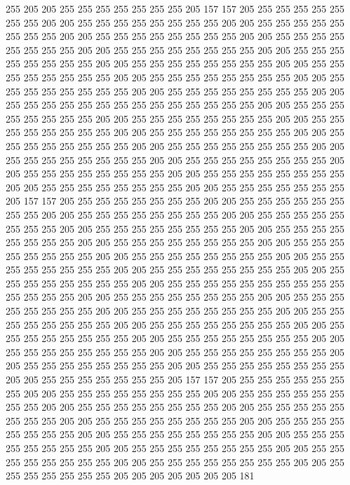 255 205 205 255 255 255 255 255 255 255 205 157 157 205 255 255 255 255 255 255
255 205 205 255 255 255 255 255 255 255 255 205 205 255 255 255 255 255 255 255
255 205 205 255 255 255 255 255 255 255 255 205 205 255 255 255 255 255 255 255
255 205 205 255 255 255 255 255 255 255 255 205 205 255 255 255 255 255 255 255
255 205 205 255 255 255 255 255 255 255 255 205 205 255 255 255 255 255 255 255
255 205 205 255 255 255 255 255 255 255 255 205 205 255 255 255 255 255 255 255
255 205 205 255 255 255 255 255 255 255 255 205 205 255 255 255 255 255 255 255
255 255 255 255 255 255 255 205 205 255 255 255 255 255 255 255 255 205 205 255
255 255 255 255 255 255 255 205 205 255 255 255 255 255 255 255 255 205 205 255
255 255 255 255 255 255 255 205 205 255 255 255 255 255 255 255 255 205 205 255
255 255 255 255 255 255 255 205 205 255 255 255 255 255 255 255 255 205 205 255
255 255 255 255 255 255 255 205 205 255 255 255 255 255 255 255 255 205 205 255
255 255 255 255 255 255 255 205 205 255 255 255 255 255 255 255 255 205 205 255
255 255 255 255 255 255 205 157 157 205 255 255 255 255 255 255 255 205 205 255
255 255 255 255 255 255 255 205 205 255 255 255 255 255 255 255 255 205 205 255
255 255 255 255 255 255 255 205 205 255 255 255 255 255 255 255 255 205 205 255
255 255 255 255 255 255 255 205 205 255 255 255 255 255 255 255 255 205 205 255
255 255 255 255 255 255 255 205 205 255 255 255 255 255 255 255 255 205 205 255
255 255 255 255 255 255 255 205 205 255 255 255 255 255 255 255 255 205 205 255
255 255 255 255 255 255 255 205 205 255 255 255 255 255 255 255 255 255 255 255
255 255 255 205 205 255 255 255 255 255 255 255 255 205 205 255 255 255 255 255
255 255 255 205 205 255 255 255 255 255 255 255 255 205 205 255 255 255 255 255
255 255 255 205 205 255 255 255 255 255 255 255 255 205 205 255 255 255 255 255
255 255 255 205 205 255 255 255 255 255 255 255 255 205 205 255 255 255 255 255
255 255 255 205 205 255 255 255 255 255 255 255 255 205 205 255 255 255 255 255
255 255 255 205 205 255 255 255 255 255 255 255 255 205 205 255 255 255 255 255
255 255 205 157 157 205 255 255 255 255 255 255 255 205 205 255 255 255 255 255
255 255 255 205 205 255 255 255 255 255 255 255 255 205 205 255 255 255 255 255
255 255 255 205 205 255 255 255 255 255 255 255 255 205 205 255 255 255 255 255
255 255 255 205 205 255 255 255 255 255 255 255 255 205 205 255 255 255 255 255
255 255 255 205 205 255 255 255 255 255 255 255 255 205 205 255 255 255 255 255
255 255 255 205 205 255 255 255 255 255 255 255 255 205 205 255 255 255 255 255
255 255 255 205 205 255 255 255 255 255 255 255 205 205 205 205 205 205 205 181
